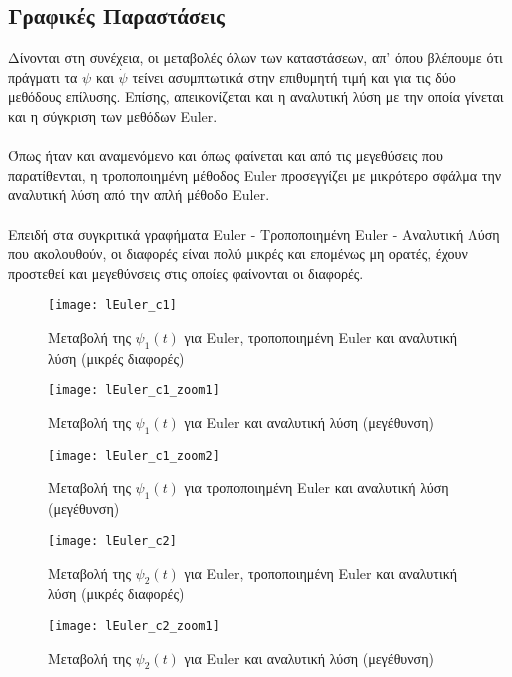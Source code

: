 \documentclass{article}
\begin{document}
\subsection{Γραφικές Παραστάσεις}
Δίνονται στη συνέχεια, οι μεταβολές όλων των καταστάσεων, απ' όπου βλέπουμε ότι πράγματι τα \(\psi\) και \(\dot{\psi}\) τείνει ασυμπτωτικά στην επιθυμητή τιμή και για τις δύο μεθόδους επίλυσης. Επίσης, απεικονίζεται και η αναλυτική λύση με την οποία γίνεται και η σύγκριση των μεθόδων Euler.
\\\\Όπως ήταν και αναμενόμενο και όπως φαίνεται και από τις μεγεθύσεις που παρατίθενται, η τροποποιημένη μέθοδος Euler προσεγγίζει με μικρότερο σφάλμα την αναλυτική λύση από την απλή μέθοδο Euler.
\\\\
Επειδή στα συγκριτικά γραφήματα Euler - Tροποποιημένη Euler - Αναλυτική Λύση που ακολουθούν, οι διαφορές είναι πολύ μικρές και επομένως μη ορατές, έχουν προστεθεί και μεγεθύνσεις στις οποίες φαίνονται οι διαφορές.

\clearpage

\begin{figure}[bh!]
 \centering
\texttt{[image: lEuler\_c1]}
\caption{Μεταβολή της $\psi_1(t)$ για Euler, τροποποιημένη
 Euler και αναλυτική λύση (μικρές διαφορές)}
\end{figure}
 \clearpage
 
\begin{figure}[h!]
 \centering
\texttt{[image: lEuler\_c1\_zoom1]}
\caption{Μεταβολή της $\psi_1(t)$ για Euler και αναλυτική λύση (μεγέθυνση)}
\end{figure}

\begin{figure}[h!]
 \centering
\texttt{[image: lEuler\_c1\_zoom2]}
\caption{Μεταβολή της $\psi_1(t)$ για τροποποιημένη Euler και αναλυτική λύση (μεγέθυνση)}
\end{figure}
 \clearpage
 
 \begin{figure}[bh!]
 \centering
\texttt{[image: lEuler\_c2]}
\caption{Μεταβολή της $\psi_2(t)$ για Euler, τροποποιημένη
 Euler και αναλυτική λύση (μικρές διαφορές)}
\end{figure}
 \clearpage
 
\begin{figure}[h!]
 \centering
\texttt{[image: lEuler\_c2\_zoom1]}
\caption{Μεταβολή της $\psi_2(t)$ για Euler και αναλυτική λύση (μεγέθυνση)}
\end{figure}
\end{document}
